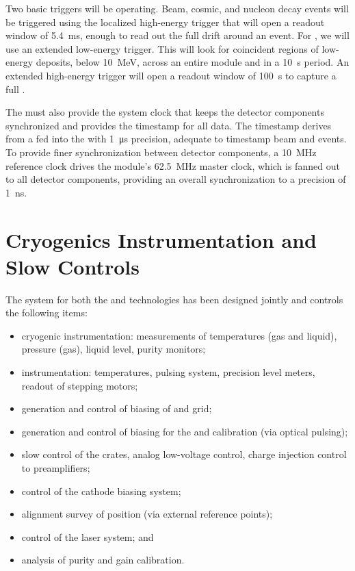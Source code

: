 Two basic triggers will be operating. Beam, cosmic, and nucleon decay events will be triggered using the localized high-energy trigger 
that will open a readout window of \SI{5.4}{\ms}, enough to read out the full  drift around an event. For , we will use an extended low-energy trigger. This will look for coincident regions of low-energy deposits, below \SI{10}{\mega\electronvolt}, across an entire module and in a \SI{10}{\second} period. An extended high-energy trigger will open a readout window of \SI{100}{\second} to capture a full . 

The  must also provide the system clock that keeps the detector components synchronized and provides the timestamp for all data. The timestamp derives from a   fed into the  with \SI{1}{\micro\second} precision, adequate to timestamp beam and  events. To provide finer synchronization between detector components, a \SI{10}{\mega\hertz} reference clock drives the module's \SI{62.5}{\mega\hertz} master clock, which is fanned out to all detector components, providing an overall synchronization to a precision of \SI{1}{\nano\second}.



\section{Cryogenics Instrumentation and Slow Controls}
\label{sec:dp-execsum-sc}

The  system for both the  and  technologies has been designed jointly and controls the following items:

\begin{itemize}
\item cryogenic instrumentation: measurements of temperatures (gas and liquid), pressure (gas), liquid level, purity monitors;
\item {} instrumentation: temperatures, pulsing system, precision level meters, readout of  stepping motors;
\item generation and control of  biasing of  and grid;
\item generation and control of  biasing for the  and calibration (via optical pulsing);
\item slow control of the  crates, analog  low-voltage control, charge injection control to preamplifiers;
\item control of the cathode  biasing system;
\item alignment survey of  position (via external reference points);
\item control of the laser system; and
\item analysis of  purity and   gain calibration.
\end{itemize}


